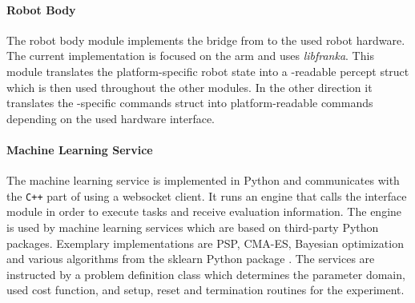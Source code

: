 \paragraph{Robot Body}
The robot body module implements the bridge from \softwareabbr{} to the used robot hardware.
The current implementation is focused on the \platformname{} arm and uses \emph{libfranka}.
This module translates the platform-specific robot state into a \softwareabbr{}-readable percept struct which is then used throughout the other modules.
In the other direction it translates the \softwareabbr{}-specific commands struct into platform-readable commands depending on the used hardware interface.

\paragraph{Machine Learning Service}
The machine learning service is implemented in Python and communicates with the \verb!C++! part of \softwareabbr{} using a websocket client.
It runs an engine that calls the interface module in order to execute tasks and receive evaluation information.
The engine is used by machine learning services which are based on third-party Python packages.
Exemplary implementations are PSP, CMA-ES, Bayesian optimization and various algorithms from the sklearn Python package \cite{Pedregosa.2010}.
The services are instructed by a problem definition class which determines the parameter domain, used cost function, and setup, reset and termination routines for the experiment.